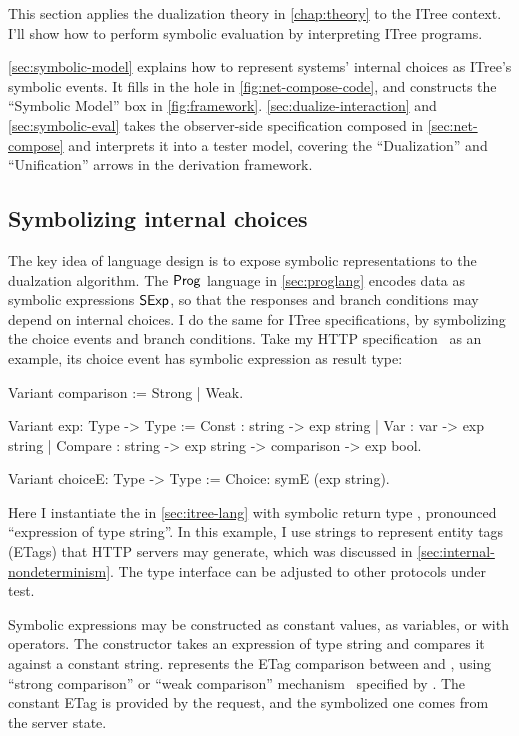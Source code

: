 This section applies the dualization theory in \autoref{chap:theory} to the
ITree context.  I'll show how to perform symbolic evaluation by interpreting
ITree programs.

\autoref{sec:symbolic-model} explains how to represent systems' internal choices
as ITree's symbolic events.  It fills in the  hole in
\autoref{fig:net-compose-code}, and constructs the ``Symbolic Model'' box in
\autoref{fig:framework}.  \autoref{sec:dualize-interaction} and
\autoref{sec:symbolic-eval} takes the observer-side specification composed in
\autoref{sec:net-compose} and interprets it into a tester model, covering the
``Dualization'' and ``Unification'' arrows in the derivation framework.

\subsection{Symbolizing internal choices}
\label{sec:symbolic-model}
The key idea of language design is to expose symbolic representations to the
dualzation algorithm.  The $\mathsf{Prog}$ language in \autoref{sec:proglang} encodes
data as symbolic expressions $\mathsf{SExp}$, so that the responses and branch
conditions may depend on internal choices.  I do the same for ITree
specifications, by symbolizing the choice events and branch conditions.  Take my
HTTP specification~\cite{issta21} as an example, its choice event has symbolic
expression as result type:

\begin{coq}
  Variant comparison := Strong | Weak.

  Variant exp: Type -> Type :=
    Const    : string -> exp string
  | Var      : var    -> exp string
  | Compare  : string -> exp string -> comparison -> exp bool.

  Variant choiceE: Type -> Type :=
    Choice: symE (exp string).
\end{coq}

Here I instantiate the  in \autoref{sec:itree-lang} with symbolic
return type , pronounced ``expression of type string''.  In
this example, I use strings to represent entity tags (ETags) that HTTP servers
may generate, which was discussed in \autoref{sec:internal-nondeterminism}.  The
type interface can be adjusted to other protocols under test.

Symbolic expressions may be constructed as constant values, as variables, or
with operators.  The  constructor takes an expression of type
string and compares it against a constant string.  
represents the ETag comparison between  and , using ``strong
comparison'' or ``weak comparison'' mechanism~\cite{rfc7232} specified by
.  The constant ETag is provided by the request, and the symbolized one
comes from the server state.

